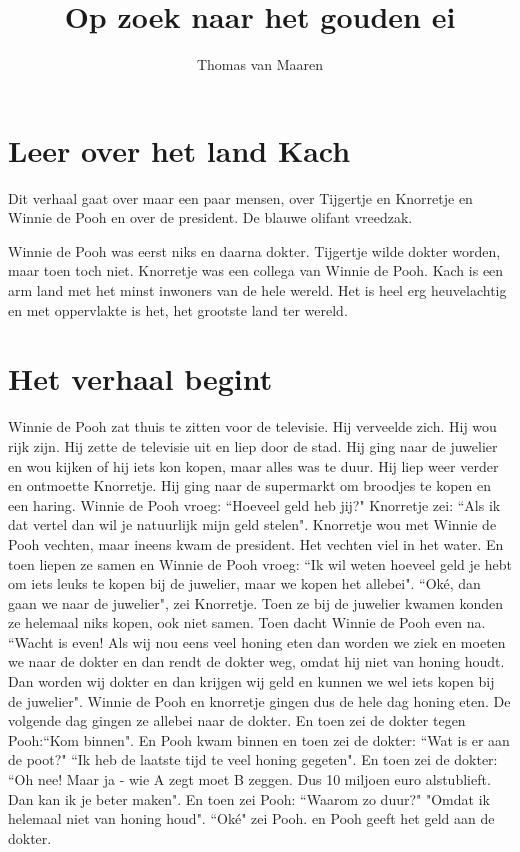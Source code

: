 \documentclass{article}
\title{Op zoek naar het gouden ei}
\author{Thomas van Maaren}
\date{}
\begin{document}
\maketitle

\section{Leer over het land Kach}

Dit verhaal gaat over maar een paar mensen, over Tijgertje en Knorretje en Winnie de Pooh en over de president. De blauwe olifant vreedzak. 

Winnie de Pooh was eerst niks en daarna dokter. Tijgertje wilde dokter worden, maar toen toch niet. Knorretje was een collega van Winnie de Pooh. Kach is een arm land met het minst inwoners van de hele wereld. Het is heel erg heuvelachtig en met oppervlakte is het, het grootste land ter wereld.

\section{Het verhaal begint}

Winnie de Pooh zat thuis te zitten voor de televisie. Hij verveelde zich. Hij wou rijk zijn. Hij zette de televisie uit en liep door de stad. Hij ging naar de juwelier en wou kijken of hij iets kon kopen, maar alles was te duur. Hij liep weer verder en ontmoette Knorretje. Hij ging naar de supermarkt om broodjes te kopen en een haring. Winnie de Pooh vroeg: ``Hoeveel geld heb jij?" Knorretje zei: ``Als ik dat vertel dan wil je natuurlijk mijn geld stelen". Knorretje wou met Winnie de Pooh vechten, maar ineens kwam de president. Het vechten viel in het water. En toen liepen ze samen en Winnie de Pooh vroeg: ``Ik wil weten hoeveel geld je hebt om iets leuks te kopen bij de juwelier, maar we kopen het allebei". ``Oké, dan gaan we naar de juwelier", zei Knorretje. Toen ze bij de juwelier kwamen konden ze helemaal niks kopen, ook niet samen. Toen dacht Winnie de Pooh even na. ``Wacht is even! Als wij nou eens veel honing eten dan worden we ziek en moeten we naar de dokter en dan rendt de dokter weg, omdat hij niet van honing houdt. Dan worden wij dokter en dan krijgen wij geld en kunnen we wel iets kopen bij de juwelier". Winnie de Pooh en knorretje gingen dus de hele dag honing eten. De volgende dag gingen ze allebei naar de dokter. En toen zei de dokter tegen Pooh:``Kom binnen". En Pooh kwam binnen en toen zei de dokter: ``Wat is er aan de poot?" ``Ik heb de laatste tijd te veel honing gegeten". En toen zei de dokter: ``Oh nee! Maar ja - wie A zegt moet B zeggen. Dus 10 miljoen euro alstublieft. Dan kan ik je beter maken". En toen zei Pooh: ``Waarom zo duur?" "Omdat ik helemaal niet van honing houd". ``Oké" zei Pooh. en Pooh geeft het geld aan de dokter.
\end{document}
